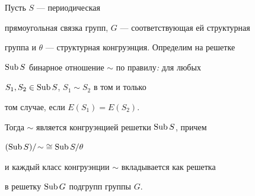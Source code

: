 \begin{propm} Пусть $S$ --- периодическая


прямоугольная связка групп, $G$ --- соответствующая ей структурная


группа и $\theta$ --- структурная конгруэнция. Определим на решетке


$\operatorname{Sub} S$ бинарное отношение $\sim$ по правилу{\em :} для любых


$S_1, S_2 \in \operatorname{Sub} S$, $S_1 \sim S_2$ в том и только


том случае, если $E(S_1) = E(S_2)$.


Тогда $\sim$ является конгруэнцией решетки $\operatorname{Sub} S$, причем


$(\operatorname{Sub} S)/\!\sim \; \cong \operatorname{Sub} S/\theta$


и каждый класс конгруэнции $\sim$ вкладывается как решетка


в решетку $\operatorname{Sub} G$ подгрупп группы $G$.


\end{propm}





